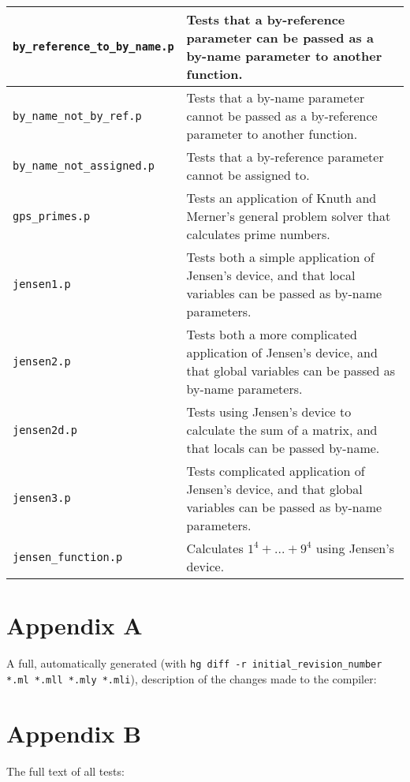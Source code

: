 \documentclass[a4paper,9pt]{article}
\begin{document}
\begin{tabularx}{\linewidth}{ |X|X| }
\hline
    \texttt{by\_reference\_to\_by\_name.p} & Tests that a by-reference parameter can be passed as a by-name parameter to another function. \\
\hline
    \texttt{by\_name\_not\_by\_ref.p} & Tests that a by-name parameter cannot be passed as a by-reference parameter to another function. \\
\hline
    \texttt{by\_name\_not\_assigned.p} & Tests that a by-reference parameter cannot be assigned to. \\
\hline
    \texttt{gps\_primes.p} & Tests an application of Knuth and Merner's general problem solver that calculates prime numbers. \\
\hline
    \texttt{jensen1.p} & Tests both a simple application of Jensen's device, and that local variables can be passed as by-name parameters. \\
\hline
    \texttt{jensen2.p} & Tests both a more complicated application of Jensen's device, and that global variables can be passed as by-name parameters. \\
\hline
    \texttt{jensen2d.p} & Tests using Jensen's device to calculate the sum of a matrix, and that locals can be passed by-name. \\
\hline
    \texttt{jensen3.p} & Tests complicated application of Jensen's device, and that global variables can be passed as by-name parameters. \\
\hline
    \texttt{jensen\_function.p} & Calculates $1^4 + ... + 9^4$ using Jensen's device. \\
\hline
\end{tabularx}
\section{Appendix A}
A full, automatically generated (with \texttt{hg diff -r initial\_revision\_number *.ml *.mll *.mly *.mli}), description of the changes made to the compiler:

\section{Appendix B}
\lstset{style=teststyle}

The full text of all tests:
\end{document}
